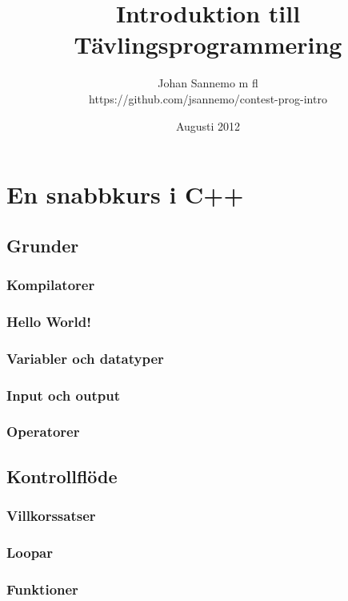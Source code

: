 \documentclass[10pt,a4paper]{report}
\author{Johan Sannemo m fl\\\small{https://github.com/jsannemo/contest-prog-intro}}
\title{Introduktion till Tävlingsprogrammering}
\date{Augusti 2012}
\begin{document}
\maketitle
\tableofcontents



\chapter{En snabbkurs i C++}

\section{Grunder}
	
\subsection{Kompilatorer}

\subsection{Hello World!}

\subsection{Variabler och datatyper}

\subsection{Input och output}

\subsection{Operatorer}


\section{Kontrollflöde}
\subsection{Villkorssatser}

\subsection{Loopar}

\subsection{Funktioner}

\end{document}
